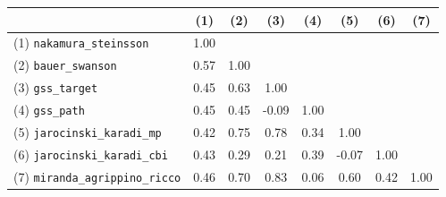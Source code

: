\begin{tabular}{lccccccc}
\toprule
&  (1) & (2) & (3) & (4) & (5) & (6) & (7)  \\
\midrule
(1) \texttt{nakamura\_steinsson} & 1.00 &  &  &  &  &  &  \\
(2) \texttt{bauer\_swanson} & 0.57 & 1.00 &  &  &  &  &  \\
(3) \texttt{gss\_target} & 0.45 & 0.63 & 1.00 &  &  &  &  \\
(4) \texttt{gss\_path} & 0.45 & 0.45 & -0.09 & 1.00 &  &  &  \\
(5) \texttt{jarocinski\_karadi\_mp} & 0.42 & 0.75 & 0.78 & 0.34 & 1.00 &  &  \\
(6) \texttt{jarocinski\_karadi\_cbi} & 0.43 & 0.29 & 0.21 & 0.39 & -0.07 & 1.00 &  \\
(7) \texttt{miranda\_agrippino\_ricco} & 0.46 & 0.70 & 0.83 & 0.06 & 0.60 & 0.42 & 1.00 \\
\bottomrule
\end{tabular}
